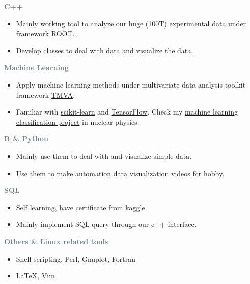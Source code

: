 
\textcolor{SlateGrey}{\textbf{C++}}
\newline

\begin{itemize}
    \item Mainly working tool to analyze our huge (100T) experimental data under framework \href{https://root.cern/}{ROOT}.
    \item Develop classes to deal with data and visualize the data.
\end{itemize}

\textcolor{SlateGrey}{\textbf{Machine Learning}}
\newline
\begin{itemize}
    \item Apply machine learning methods under multivariate data analysis toolkit framework \href{https://root.cern/manual/tmva/}{TMVA}.
    \item Familiar with \href{https://scikit-learn.org/stable/}{scikit-learn} and \href{https://www.tensorflow.org/}{TensorFlow}. Check my \href{https://github.com/mhzhao/ML_DYclassification}{machine learning classification project} in nuclear physics.
\end{itemize}
      
\textcolor{SlateGrey}{\textbf{R \& Python}}
\newline

\begin{itemize}
    \item Mainly use them to deal with and visualize simple data.
    \item Use them to make automation data visualization videos for hobby. 
\end{itemize}

\textcolor{SlateGrey}{\textbf{SQL}}
\newline

\begin{itemize}
    \item Self learning, have certificate from \href{https://www.kaggle.com/learn/overview}{kaggle}.
    \item Mainly implement SQL query through our c++ interface.
\end{itemize}

\textcolor{SlateGrey}{\textbf{Others \& Linux related tools}}
\newline

\begin{itemize}
    \item Shell scripting, Perl, Gnuplot, Fortran 
    \item \LaTeX, Vim
\end{itemize}

